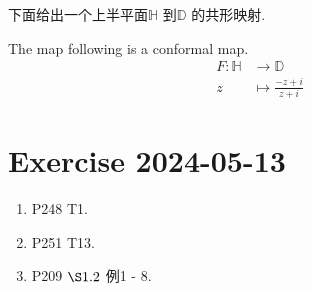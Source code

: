 	\vspace*{4em}
	下面给出一个上半平面$\mathbb{H}$ 到$\mathbb{D}$ 的共形映射.
	\begin{thm}\label{thm 12.3.1}
		The map following is a conformal map.
		\begin{align}
			F : \mathbb{H} &\longrightarrow \mathbb{D} \\
			z &\longmapsto \frac{-z + i}{z + i}
		\end{align}
	\end{thm}

\newpage
\section{Exercise 2024-05-13}
	\begin{enumerate}
		\item P248 T1. 
		
		\vspace*{2em}
		
		\item P251 T13.
		
		\vspace*{2em}
		
		\item P209 $\S 1.2$ 例1 - 8.
	\end{enumerate}




	\ifx\allfiles\undefined

\fi